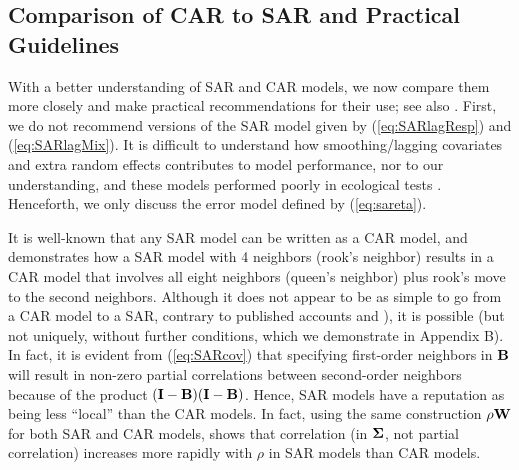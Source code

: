 \documentclass[11pt, titlepage]{article}\usepackage[]{graphicx}\usepackage[]{color}
\begin{document}
\subsection*{Comparison of CAR to SAR and Practical Guidelines}

With a better understanding of SAR and CAR models, we now compare them more closely and make practical recommendations for their use; see also \citet{Wall:clos:2004}. First, we do not recommend versions of the SAR model given by (\ref{eq:SARlagResp}) and (\ref{eq:SARlagMix}).  It is difficult to understand how smoothing/lagging covariates and extra random effects contributes to model performance, nor to our understanding, and these models performed poorly in ecological tests \citep{Dorm:etal:meth:2007, Kiss:Carl:spat:2008}. Henceforth, we only discuss the error model defined by (\ref{eq:sareta}). 

It is well-known that any SAR model can be written as a CAR model, and \citet[pg. 408]{Cres:stat:1993} demonstrates how a SAR model with 4 neighbors (rook's neighbor) results in a CAR model that involves all eight neighbors (queen's neighbor) plus rook's move to the second neighbors.  Although it does not appear to be as simple to go from a CAR model to a SAR, contrary to published accounts \citep[pg. 408]{Cres:stat:1993} and \citep[pg. 86]{Bane:Carl:Gelf:hier:2004}), it is possible (but not uniquely, without further conditions, which we demonstrate in Appendix B). In fact, it is evident from (\ref{eq:SARcov}) that specifying first-order neighbors in $\mathbf{B}$ will result in non-zero partial correlations between second-order neighbors because of the product $(\mathbf{I} - \mathbf{B})(\mathbf{I} - \mathbf{B})$.  Hence, SAR models have a reputation as being less ``local'' than the CAR models.  In fact, using the same construction $\rho\mathbf{W}$ for both SAR and CAR models, \citet{Wall:clos:2004} shows that correlation (in $\mbox{\boldmath $\Sigma$}$, not partial correlation) increases more rapidly with $\rho$ in SAR models than CAR models. 
\end{document}

